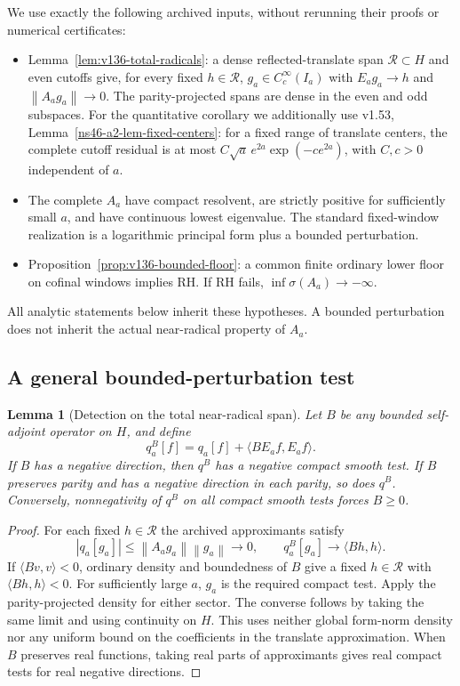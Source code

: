 \documentclass[11pt]{article}
\newtheorem{lemma}[theorem]{Lemma}
\theoremstyle{remark}
\newcommand{\norm}[1]{\left\lVert #1\right\rVert}
\begin{document}
We use exactly the following archived inputs, without rerunning their proofs
or numerical certificates:
\begin{itemize}
\item Lemma~\ref{lem:v136-total-radicals}: a dense reflected-translate
span $\mathcal R\subset H$ and even cutoffs give, for every fixed
$h\in\mathcal R$, $g_a\in C_c^\infty(I_a)$ with
$E_ag_a\to h$ and $\norm{A_ag_a}\to0$.
The parity-projected spans are dense in the even and odd subspaces.
For the quantitative corollary we additionally use v1.53,
Lemma~\ref{ns46-a2-lem-fixed-centers}: for a fixed range of translate
centers, the complete cutoff residual is at most
$C\sqrt a\,e^{2a}\exp(-c e^{2a})$, with $C,c>0$ independent of $a$.
\item The complete $A_a$ have compact resolvent, are strictly positive
for sufficiently small $a$, and have continuous lowest eigenvalue.
The standard fixed-window realization is a logarithmic principal form
plus a bounded perturbation.
\item Proposition~\ref{prop:v136-bounded-floor}: a common finite
ordinary lower floor on cofinal windows implies RH. If RH fails,
$\inf\sigma(A_a)\to-\infty$.
\end{itemize}
All analytic statements below inherit these hypotheses. A bounded perturbation
does not inherit the actual near-radical property of $A_a$.

\subsection*{A general bounded-perturbation test}
\begin{lemma}[Detection on the total near-radical span]\label{lem:ns57-bounded-detection}
Let $B$ be any bounded self-adjoint operator on $H$, and define
\[
 q_a^B[f]=q_a[f]+\langle BE_af,E_af\rangle.
\]
If $B$ has a negative direction, then $q^B$ has a negative compact
smooth test. If $B$ preserves parity and has a negative direction
in each parity, so does $q^B$. Conversely, nonnegativity of $q^B$
on all compact smooth tests forces $B\ge0$.
\end{lemma}
\begin{proof}
For each fixed $h\in\mathcal R$ the archived approximants satisfy
\[
 |q_a[g_a]|\le\norm{A_ag_a}\norm{g_a}\longrightarrow0,
 \qquad q_a^B[g_a]\longrightarrow\langle Bh,h\rangle.
\]
If $\langle Bv,v\rangle<0$, ordinary density and boundedness of $B$
give a fixed $h\in\mathcal R$ with $\langle Bh,h\rangle<0$.
For sufficiently large $a$, $g_a$ is the required compact test.
Apply the parity-projected density for either sector. The converse
follows by taking the same limit and using continuity on $H$.
This uses neither global form-norm density nor any uniform bound
on the coefficients in the translate approximation.
When $B$ preserves real functions, taking real parts of approximants
gives real compact tests for real negative directions.
\end{proof}
\end{document}
